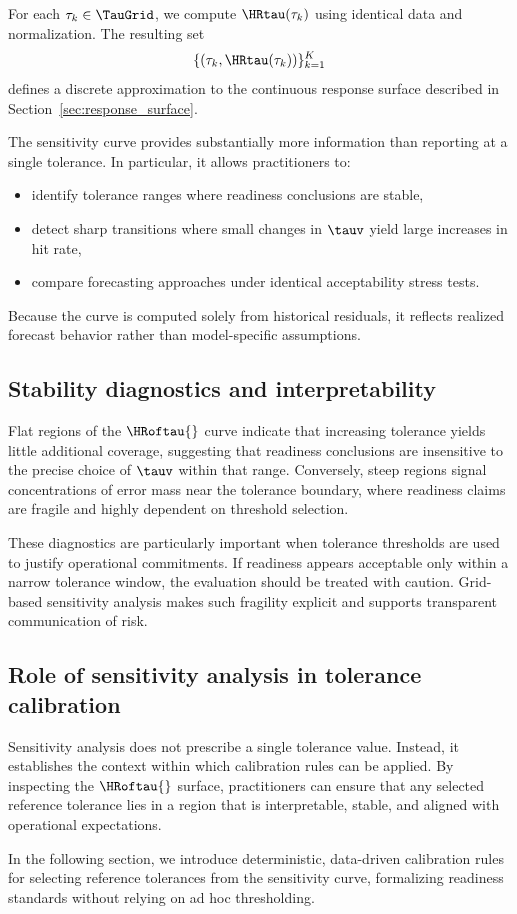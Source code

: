 For each $\tau_k \in \TauGrid$, we compute $\HRtau(\tau_k)$ using identical data
and normalization.
The resulting set
\[
    \{(\tau_k, \HRtau(\tau_k))\}_{k=1}^{K}
\]
defines a discrete approximation to the continuous response surface described in
Section~\ref{sec:response_surface}.

The sensitivity curve provides substantially more information than reporting
\HRtau{} at a single tolerance.
In particular, it allows practitioners to:
\begin{itemize}[leftmargin=*]
    \item identify tolerance ranges where readiness conclusions are stable,
    \item detect sharp transitions where small changes in $\tauv$ yield large
          increases in hit rate,
    \item compare forecasting approaches under identical acceptability stress
          tests.
\end{itemize}

Because the curve is computed solely from historical residuals, it reflects
realized forecast behavior rather than model-specific assumptions.

\subsection{Stability diagnostics and interpretability}
\label{subsec:hrtau_stability}

Flat regions of the $\HRoftau{}$ curve indicate that increasing tolerance yields
little additional coverage, suggesting that readiness conclusions are insensitive
to the precise choice of $\tauv$ within that range.
Conversely, steep regions signal concentrations of error mass near the tolerance
boundary, where readiness claims are fragile and highly dependent on threshold
selection.

These diagnostics are particularly important when tolerance thresholds are used
to justify operational commitments.
If readiness appears acceptable only within a narrow tolerance window, the
evaluation should be treated with caution.
Grid-based sensitivity analysis makes such fragility explicit and supports
transparent communication of risk.

\subsection{Role of sensitivity analysis in tolerance calibration}
\label{subsec:tau_sensitivity_role}

Sensitivity analysis does not prescribe a single tolerance value.
Instead, it establishes the context within which calibration rules can be applied.
By inspecting the $\HRoftau{}$ surface, practitioners can ensure that any selected
reference tolerance lies in a region that is interpretable, stable, and aligned
with operational expectations.

In the following section, we introduce deterministic, data-driven calibration
rules for selecting reference tolerances from the sensitivity curve, formalizing
readiness standards without relying on ad hoc thresholding.
